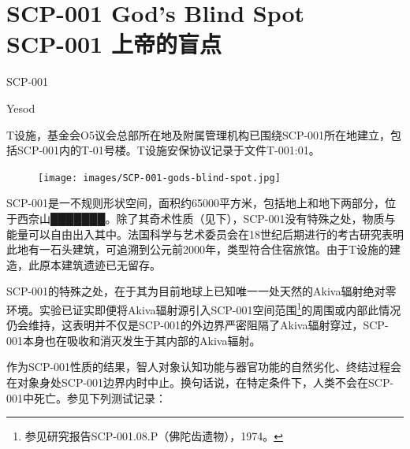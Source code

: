 \chapter[SCP-001 上帝的盲点]{
    SCP-001 God's Blind Spot\\
    SCP-001 上帝的盲点
}

\label{chap:SCP-001.gods.blind.spot}

SCP-001

Yesod

T设施，基金会O5议会总部所在地及附属管理机构已围绕SCP-001所在地建立，包括SCP-001内的T-01号楼。T设施安保协议记录于文件T-001:01。

\begin{figure}[H]
    \centering
    \texttt{[image: images/SCP-001-gods-blind-spot.jpg]}
    \caption*{}
\end{figure}

SCP-001是一不规则形状空间，面积约65000平方米，包括地上和地下两部分，位于西奈山███████。除了其奇术性质（见下），SCP-001没有特殊之处，物质与能量可以自由出入其中。法国科学与艺术委员会在18世纪后期进行的考古研究表明此地有一石头建筑，可追溯到公元前2000年，类型符合住宿旅馆。由于T设施的建造，此原本建筑遗迹已无留存。

SCP-001的特殊之处，在于其为目前地球上已知唯一一处天然的Akiva辐射绝对零环境。实验已证实即便将Akiva辐射源引入SCP-001空间范围\footnote{参见研究报告SCP-001.08.P（佛陀齿遗物），1974。}的周围或内部此情况仍会维持，这表明并不仅是SCP-001的外边界严密阻隔了Akiva辐射穿过，SCP-001本身也在吸收和消灭发生于其内部的Akiva辐射。

作为SCP-001性质的结果，智人对象认知功能与器官功能的自然劣化、终结过程会在对象身处SCP-001边界内时中止。换句话说，在特定条件下，人类不会在SCP-001中死亡。参见下列测试记录：

